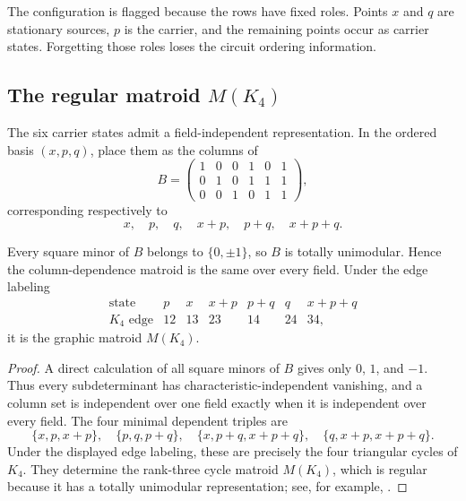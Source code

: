 The configuration is flagged because the rows have fixed roles.  Points $x$ and $q$ are stationary sources, $p$ is the carrier, and the remaining points occur as carrier states.  Forgetting those roles loses the circuit ordering information.

\subsection{The regular matroid \texorpdfstring{$M(K_4)$}{M(K4)}}

The six carrier states admit a field-independent representation.  In the ordered basis $(x,p,q)$, place them as the columns of
\begin{equation}\label{g:eq:k4-matrix}
B=
\begin{pmatrix}
1&0&0&1&0&1\\
0&1&0&1&1&1\\
0&0&1&0&1&1
\end{pmatrix},
\end{equation}
corresponding respectively to
\[
x,
\quad p,
\quad q,
\quad x+p,
\quad p+q,
\quad x+p+q.
\]

\begin{proposition}\label{g:prop:regular-matroid}
Every square minor of $B$ belongs to $\{0,\pm1\}$, so $B$ is totally unimodular.  Hence the column-dependence matroid is the same over every field.  Under the edge labeling
\[
\begin{array}{c|cccccc}
\text{state}&p&x&x+p&p+q&q&x+p+q\\
\hline
K_4\text{ edge}&12&13&23&14&24&34,
\end{array}
\]
it is the graphic matroid $M(K_4)$.
\end{proposition}

\begin{proof}
A direct calculation of all square minors of $B$ gives only $0$, $1$, and $-1$.  Thus every subdeterminant has characteristic-independent vanishing, and a column set is independent over one field exactly when it is independent over every field.  The four minimal dependent triples are
\[
\{x,p,x+p\},
\quad
\{p,q,p+q\},
\quad
\{x,p+q,x+p+q\},
\quad
\{q,x+p,x+p+q\}.
\]
Under the displayed edge labeling, these are precisely the four triangular cycles of $K_4$.  They determine the rank-three cycle matroid $M(K_4)$, which is regular because it has a totally unimodular representation; see, for example, \cite{g:Oxley2011}.
\end{proof}

